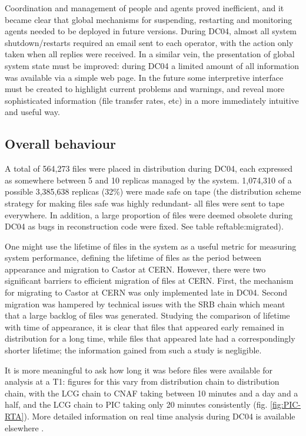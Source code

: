 \documentclass{cmspaper}
\begin{document}
Coordination and management of people and agents proved inefficient,
and it became clear that global mechanisms for suspending, restarting
and monitoring agents needed to be deployed in future versions. During
DC04, almost all system shutdown/restarts required an email sent to
each operator, with the action only taken when all replies were
received. In a similar vein, the presentation of global system state
must be improved: during DC04 a limited amount of all information was
available via a simple web page. In the future some interpretive
interface must be created to highlight current problems and warnings,
and reveal more sophisticated information (file transfer rates, etc)
in a more immediately intuitive and useful way.

\subsection{Overall behaviour}
A total of 564,273 files were placed in distribution during DC04, each
expressed as somewhere between 5 and 10 replicas managed by the system.
1,074,310 of a possible 3,385,638 replicas (32\%) were made safe on tape
(the distribution scheme strategy for making files safe was highly
redundant- all files were sent to tape everywhere. In addition, a large proportion of files were deemed obsolete during DC04 as bugs in reconstruction code were fixed. See table ref{table:migrated}). 

One might use the lifetime of files in the system as a useful metric
for measuring system performance, defining the lifetime of files as
the period between appearance and migration to Castor at
CERN. However, there were two significant barriers to efficient
migration of files at CERN. First, the mechanism for migrating to
Castor at CERN was only implemented late in DC04. Second migration was
hampered by technical issues with the SRB chain which meant that a
large backlog of files was generated. Studying the comparison of
lifetime with time of appearance, it is clear that files that appeared
early remained in distribution for a long time, while files that
appeared late had a correspondingly shorter lifetime; the information
gained from such a study is negligible.

It is more meaningful to ask how long it was before files were
available for analysis at a T1: figures for this vary from
distribution chain to distribution chain, with the LCG chain to CNAF
taking between 10 minutes and a day and a half, and the LCG chain to
PIC taking only 20 minutes consistently (fig. \ref{fig:PIC-RTA}). More
detailed information on real time analysis during DC04 is available
elsewhere \cite{rtadoc}.
\end{document}
